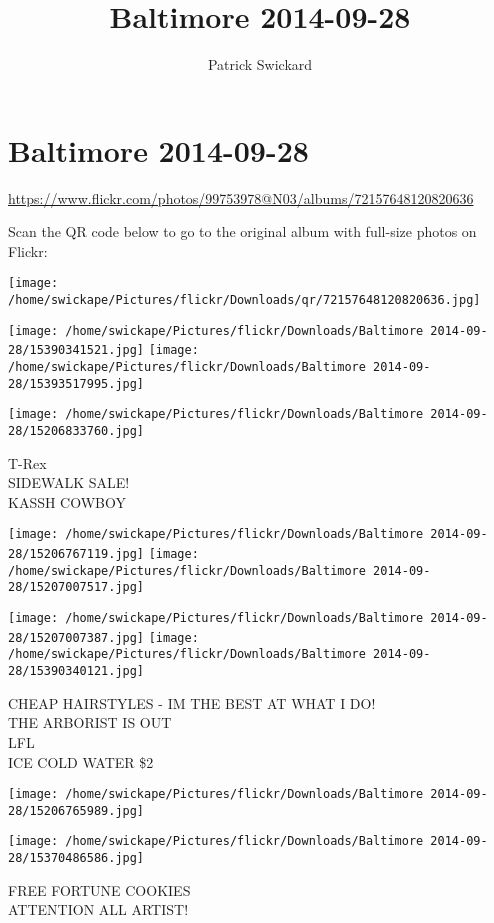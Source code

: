 \documentclass[10pt,letterpaper]{article}
\title{Baltimore 2014-09-28}
\author{Patrick Swickard}
\date{}
\begin{document}
\section*{Baltimore 2014-09-28}

\url{https://www.flickr.com/photos/99753978@N03/albums/72157648120820636}

Scan the QR code below to go to the original album with full-size photos on Flickr:

\texttt{[image: /home/swickape/Pictures/flickr/Downloads/qr/72157648120820636.jpg]}
\pagebreak

\texttt{[image: /home/swickape/Pictures/flickr/Downloads/Baltimore 2014-09-28/15390341521.jpg]}
\texttt{[image: /home/swickape/Pictures/flickr/Downloads/Baltimore 2014-09-28/15393517995.jpg]}

\vspace{0.25in}
\texttt{[image: /home/swickape/Pictures/flickr/Downloads/Baltimore 2014-09-28/15206833760.jpg]}

T{-}Rex\\
SIDEWALK SALE!\\
KASSH COWBOY
\pagebreak

\texttt{[image: /home/swickape/Pictures/flickr/Downloads/Baltimore 2014-09-28/15206767119.jpg]}
\texttt{[image: /home/swickape/Pictures/flickr/Downloads/Baltimore 2014-09-28/15207007517.jpg]}

\texttt{[image: /home/swickape/Pictures/flickr/Downloads/Baltimore 2014-09-28/15207007387.jpg]}
\texttt{[image: /home/swickape/Pictures/flickr/Downloads/Baltimore 2014-09-28/15390340121.jpg]}

CHEAP HAIRSTYLES {-} IM THE BEST AT WHAT I DO!\\
THE ARBORIST IS OUT\\
LFL\\
ICE COLD WATER \$2
\pagebreak

\texttt{[image: /home/swickape/Pictures/flickr/Downloads/Baltimore 2014-09-28/15206765989.jpg]}

\vspace{0.25in}
\texttt{[image: /home/swickape/Pictures/flickr/Downloads/Baltimore 2014-09-28/15370486586.jpg]}

FREE FORTUNE COOKIES\\
ATTENTION ALL ARTIST!
\pagebreak
\end{document}
